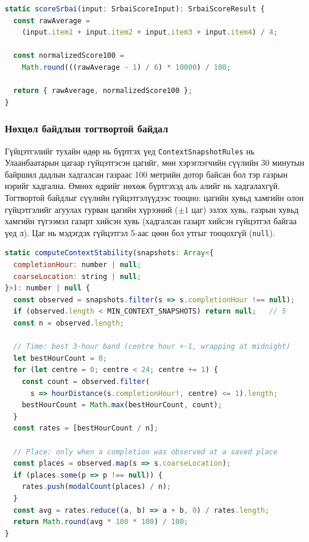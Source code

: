 \begin{lstlisting}[language=JavaScript, caption={SRBAI-ийн оноо тооцоолох дүрэм}]
static scoreSrbai(input: SrbaiScoreInput): SrbaiScoreResult {
  const rawAverage =
    (input.item1 + input.item2 + input.item3 + input.item4) / 4;

  const normalizedScore100 =
    Math.round(((rawAverage - 1) / 6) * 10000) / 100;

  return { rawAverage, normalizedScore100 };
}
\end{lstlisting}

\subsubsection*{Нөхцөл байдлын тогтвортой байдал}

Гүйцэтгэлийг тухайн өдөр нь бүртгэх үед \texttt{ContextSnapshotRules} нь Улаанбаатарын цагаар гүйцэтгэсэн цагийг, мөн хэрэглэгчийн сүүлийн 30 минутын байршил дадлын хадгалсан газраас 100 метрийн дотор байсан бол тэр газрын нэрийг хадгална. Өмнөх өдрийг нөхөж бүртгэхэд аль алийг нь хадгалахгүй. Тогтвортой байдлыг сүүлийн гүйцэтгэлүүдээс тооцно: цагийн хувьд хамгийн олон гүйцэтгэлийг агуулах гурван цагийн хүрээний ($\pm 1$ цаг) эзлэх хувь, газрын хувьд хамгийн түгээмэл газарт хийсэн хувь (хадгалсан газарт хийсэн гүйцэтгэл байгаа үед л). Цаг нь мэдэгдэх гүйцэтгэл 5-аас цөөн бол утгыг тооцохгүй (\texttt{null}).

\begin{lstlisting}[language=JavaScript, caption={Нөхцөл байдлын тогтвортой байдлын тооцоолол (товчилсон)}]
static computeContextStability(snapshots: Array<{
  completionHour: number | null;
  coarseLocation: string | null;
}>): number | null {
  const observed = snapshots.filter(s => s.completionHour !== null);
  if (observed.length < MIN_CONTEXT_SNAPSHOTS) return null;   // 5
  const n = observed.length;

  // Time: best 3-hour band (centre hour +-1, wrapping at midnight)
  let bestHourCount = 0;
  for (let centre = 0; centre < 24; centre += 1) {
    const count = observed.filter(
      s => hourDistance(s.completionHour!, centre) <= 1).length;
    bestHourCount = Math.max(bestHourCount, count);
  }
  const rates = [bestHourCount / n];

  // Place: only when a completion was observed at a saved place
  const places = observed.map(s => s.coarseLocation);
  if (places.some(p => p !== null)) {
    rates.push(modalCount(places) / n);
  }
  const avg = rates.reduce((a, b) => a + b, 0) / rates.length;
  return Math.round(avg * 100 * 100) / 100;
}
\end{lstlisting}

